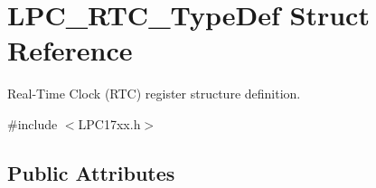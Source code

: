 \hypertarget{struct_l_p_c___r_t_c___type_def}{\section{\-L\-P\-C\-\_\-\-R\-T\-C\-\_\-\-Type\-Def \-Struct \-Reference}
\label{struct_l_p_c___r_t_c___type_def}
}


\-Real-\/\-Time \-Clock (\-R\-T\-C) register structure definition.  




{\ttfamily \#include $<$\-L\-P\-C17xx.\-h$>$}

\subsection*{\-Public \-Attributes}
